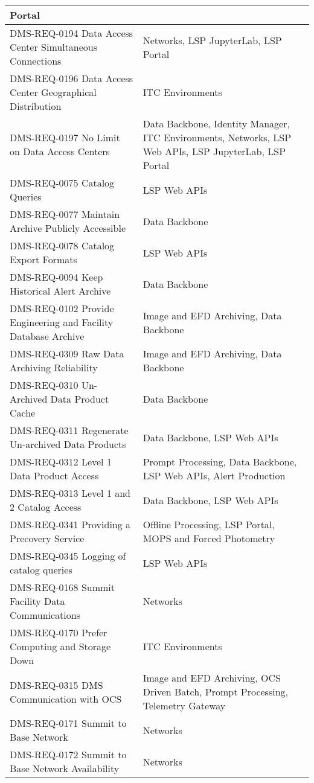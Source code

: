 \begin{xtabular}{p{0.4\textwidth}p{0.55\textwidth}}
Portal\\ \hline
DMS-REQ-0194 Data Access Center Simultaneous Connections & Networks, LSP
JupyterLab, LSP Portal\\ \hline
DMS-REQ-0196 Data Access Center Geographical Distribution & ITC
Environments\\ \hline
DMS-REQ-0197 No Limit on Data Access Centers & Data Backbone, Identity
Manager, ITC Environments, Networks, LSP Web APIs, LSP JupyterLab,
LSP Portal\\ \hline
DMS-REQ-0075 Catalog Queries & LSP Web APIs\\ \hline
DMS-REQ-0077 Maintain Archive Publicly Accessible & Data
Backbone\\ \hline
DMS-REQ-0078 Catalog Export Formats & LSP Web APIs\\ \hline
DMS-REQ-0094 Keep Historical Alert Archive & Data
Backbone\\ \hline
DMS-REQ-0102 Provide Engineering and Facility Database Archive & Image
and EFD Archiving, Data Backbone\\ \hline
DMS-REQ-0309 Raw Data Archiving Reliability & Image and EFD Archiving,
Data Backbone\\ \hline
DMS-REQ-0310 Un-Archived Data Product Cache & Data
Backbone\\ \hline
DMS-REQ-0311 Regenerate Un-archived Data Products & Data Backbone, LSP Web APIs\\ \hline
DMS-REQ-0312 Level 1 Data Product Access & Prompt Processing, Data
Backbone, LSP Web APIs, Alert Production\\ \hline
DMS-REQ-0313 Level 1 and 2 Catalog Access & Data Backbone, LSP Web APIs\\ \hline
DMS-REQ-0341 Providing a Precovery Service & Offline Processing, LSP
Portal, MOPS and Forced Photometry\\ \hline
DMS-REQ-0345 Logging of catalog queries & LSP Web APIs\\ \hline
DMS-REQ-0168 Summit Facility Data Communications &
Networks\\ \hline
DMS-REQ-0170 Prefer Computing and Storage Down & ITC
Environments\\ \hline
DMS-REQ-0315 DMS Communication with OCS & Image and EFD Archiving, OCS
Driven Batch, Prompt Processing, Telemetry Gateway\\ \hline
DMS-REQ-0171 Summit to Base Network & Networks\\ \hline
DMS-REQ-0172 Summit to Base Network Availability &
Networks\\ \hline

\end{xtabular}
